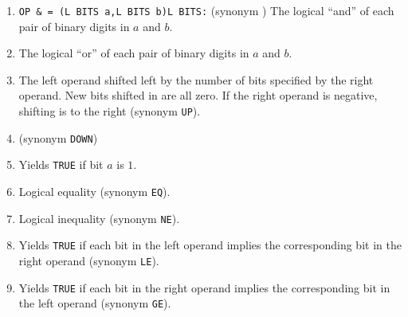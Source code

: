\begin{enumerate}
\item \verb|OP & = (L BITS a,L BITS b)L BITS:|\newline
(synonym )\newline
The logical ``and'' of each pair of binary digits in $a$ and $b$.
\item {} \newline
The logical ``or'' of each pair of binary digits in $a$ and $b$.
\item {}\newline
The left operand shifted left by the number of bits specified by the
right operand. New bits shifted in are all zero. If the right operand is
negative, shifting is to the right (synonym \verb|UP|).
\item {}\newline
(synonym \verb|DOWN|)
\item {} \newline
Yields \verb|TRUE| if bit $a$ is $1$.
\item {} \newline
Logical equality (synonym \verb|EQ|).
\item {} \newline
Logical inequality (synonym \verb|NE|).
\item {}\newline
Yields \verb|TRUE| if each bit in the left operand implies the
corresponding bit in the right operand (synonym \verb|LE|).
\item {}\newline
Yields \verb|TRUE| if each bit in the right operand implies the
corresponding bit in the left operand (synonym \verb|GE|).
\end{enumerate}


